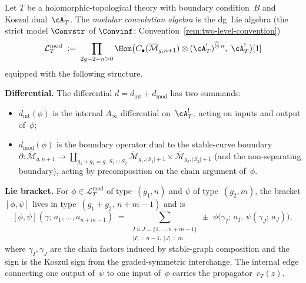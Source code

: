 \begin{definition}
\label{def:modular-yangian-pro}
\label{def:modular-yangian}
Let $T$ be a holomorphic-topological theory with boundary
condition~$B$ and Koszul dual~$\cA_T^!$. The
\emph{modular convolution algebra} is the dg~Lie algebra
(the strict model $\Convstr$ of $\Convinf$; Convention~\ref{rem:two-level-convention})
\[
 \mathcal{L}_T^{\mathrm{mod}}
 \;:=\;
 \prod_{2g-2+n>0}
 \Hom\bigl(
 C_\bullet(\overline{\mathcal{M}}_{g,n+1})
 \otimes (\cA_T^!)^{\widehat{\otimes}\,n},\;
 \cA_T^!
 \bigr)[1]
\]
equipped with the following structure.

\medskip\noindent\textbf{Differential.}\;
The differential $d = d_{\mathrm{int}} + d_{\mathrm{mod}}$
has two summands:
\begin{itemize}
\item $d_{\mathrm{int}}(\phi)$ is the internal $A_\infty$
 differential on~$\cA_T^!$, acting on inputs and output of~$\phi$;
\item $d_{\mathrm{mod}}(\phi)$ is the boundary operator
 dual to the stable-curve boundary
 $\partial \colon \overline{\mathcal{M}}_{g,n+1}
 \to \coprod_{g_1+g_2=g,\,S_1 \sqcup S_2}
 \overline{\mathcal{M}}_{g_1,|S_1|+1}
 \times \overline{\mathcal{M}}_{g_2,|S_2|+1}$
 (and the non-separating boundary), acting by precomposition
 on the chain argument of~$\phi$.
\end{itemize}

\noindent\textbf{Lie bracket.}\;
For $\phi \in \mathcal{L}_T^{\mathrm{mod}}$ of type~$(g_1,n)$
and $\psi$ of type~$(g_2,m)$, the bracket
$[\phi,\psi]$ lives in type~$(g_1+g_2,\,n+m-1)$ and is
\[
 [\phi,\psi](\gamma;\, a_1,\ldots,a_{n+m-1})
 \;=\;
 \sum_{\substack{I \sqcup J = \{1,\ldots,n+m-1\}\\
 |I|=n-1,\; |J|=m}}
 \pm\;\phi\bigl(\gamma_I;\, a_I,\,
 \psi(\gamma_J;\, a_J)\bigr),
\]
where $\gamma_I,\gamma_J$ are the chain factors induced by
stable-graph composition and the sign is the Koszul sign
from the graded-symmetric interchange. The internal edge
connecting one output of~$\psi$ to one input of~$\phi$
carries the propagator~$r_T(z)$.


\end{definition}
